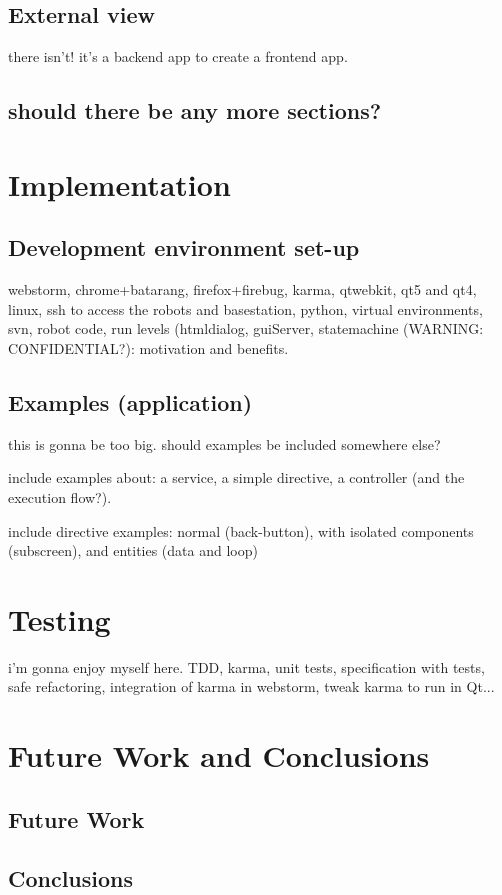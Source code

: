 \section{External view}
there isn't! it's a backend app to create a frontend app.

\section{should there be any more sections?}

\chapter{Implementation}
\section{Development environment set-up}
webstorm, chrome+batarang, firefox+firebug, karma, qtwebkit, qt5 and qt4, linux, ssh to access the robots and basestation, python, virtual environments, svn, robot code, run levels (htmldialog, guiServer, statemachine (WARNING: CONFIDENTIAL?): motivation and benefits.

\section{Examples (application)}
this is gonna be too big. should examples be included somewhere else?

include examples about: a service, a simple directive, a controller (and the execution flow?).

include directive examples: normal (back-button), with isolated components (subscreen), and entities (data and loop)

\chapter{Testing}
i'm gonna enjoy myself here.
TDD, karma, unit tests, specification with tests, safe refactoring, integration of karma in webstorm, tweak karma to run in Qt...


\chapter{Future Work and Conclusions}
\section{Future Work}
\section{Conclusions}